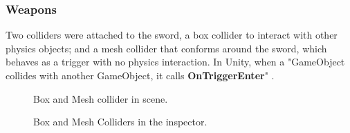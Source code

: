 \documentclass[12pt]{report}
\begin{document}
\subsubsection{Weapons}
Two colliders were attached to the sword, a box collider to interact with other physics objects; and a mesh collider that conforms around the sword, which behaves as a trigger with no physics interaction. In Unity, when a "GameObject collides with another GameObject, it calls \textbf{OnTriggerEnter}" \cite{UnityTriggerCollider}.  
\begin{figure}[H]
    \begin{minipage}{.3\textwidth}
        \centering
        \caption{Box and Mesh collider in scene.}
    \end{minipage}
    \begin{minipage}{.8\textwidth}
        \centering
        \caption{Box and Mesh Colliders in the inspector.}
    \end{minipage}
\end{figure}
\end{document}

